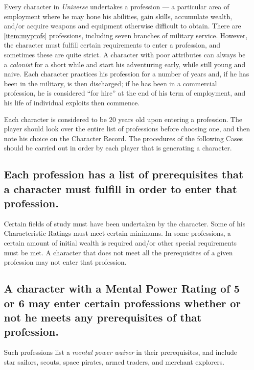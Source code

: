 Every character in \emph{Universe} undertakes a profession --- a
particular area of employment where he may hone his abilities, gain
skills, accumulate wealth, and/or acquire weapons and equipment
otherwise difficult to obtain. There are 
\ref{item:myprofs}
professions, including
seven branches of military service. However, the character must
fulfill certain requirements to enter a profession, and sometimes
these are quite strict. A character with poor attributes can always be
a \emph{colonist} for a short while and start his adventuring early,
while still young and naive. Each character practices his profession
for a number of years and, if he has been in the military, is then
discharged; if he has been in a commercial profession, he is
considered ``for hire'' at the end of his term of employment, and his
life of individual exploits then commence.

Each character is considered to be 20 years old upon entering a
profession. The player should look over the entire list of professions
before choosing one, and then note his choice on the Character Record.
The procedures of the following Cases should be carried out in order
by each player that is generating a character.


\subsection[Prerequisites]{Each profession has a list of prerequisites
  that a 
  character must  fulfill in order to enter that profession.}
\label{sec:each-profession-has}

Certain fields of study must have been undertaken by the character.
Some of his Characteristic Ratings must meet certain minimums. In some
professions, a certain amount of initial wealth is required and/or
other special requirements must be met. A character that does not meet
all the prerequisites of a given profession may not enter that
profession.


\subsection[Mental Power Waiver]{A character with a Mental Power
  Rating of 5 or 6 may enter 
  certain professions whether or not he  meets any prerequisites of
  that profession.}
\label{sec:mental-power-waiver}

Such professions list a \emph{mental power waiver} in their
prerequisites, and include star sailors, scouts, space pirates,
armed traders, and merchant explorers.

